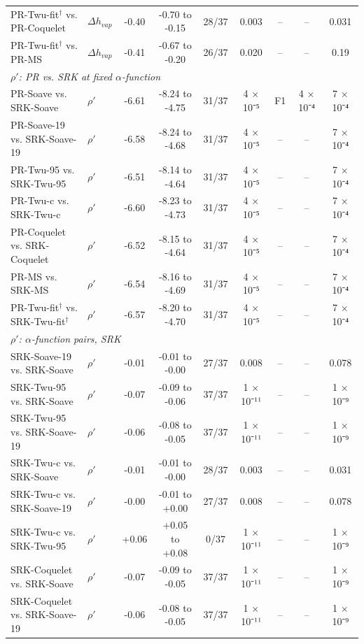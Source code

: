 \begin{table}[H]
\begin{tabular}{llccccccc}
PR-Twu-fit$^{\dagger}$ vs. PR-Coquelet & $\Delta h_{vap}$ & -0.40 & -0.70 to -0.15 & 28/37 & 0.003 & -- & -- & 0.031 \\
PR-Twu-fit$^{\dagger}$ vs. PR-MS & $\Delta h_{vap}$ & -0.41 & -0.67 to -0.20 & 26/37 & 0.020 & -- & -- & 0.19 \\
\multicolumn{9}{l}{\emph{$\rho'$: PR vs. SRK at fixed $\alpha$-function}} \\
PR-Soave vs. SRK-Soave & $\rho'$ & -6.61 & -8.24 to -4.75 & 31/37 & 4 × 10⁻⁵ & F1 & 4 × 10⁻⁴ & 7 × 10⁻⁴ \\
PR-Soave-19 vs. SRK-Soave-19 & $\rho'$ & -6.58 & -8.24 to -4.68 & 31/37 & 4 × 10⁻⁵ & -- & -- & 7 × 10⁻⁴ \\
PR-Twu-95 vs. SRK-Twu-95 & $\rho'$ & -6.51 & -8.14 to -4.64 & 31/37 & 4 × 10⁻⁵ & -- & -- & 7 × 10⁻⁴ \\
PR-Twu-c vs. SRK-Twu-c & $\rho'$ & -6.60 & -8.23 to -4.73 & 31/37 & 4 × 10⁻⁵ & -- & -- & 7 × 10⁻⁴ \\
PR-Coquelet vs. SRK-Coquelet & $\rho'$ & -6.52 & -8.15 to -4.64 & 31/37 & 4 × 10⁻⁵ & -- & -- & 7 × 10⁻⁴ \\
PR-MS vs. SRK-MS & $\rho'$ & -6.54 & -8.16 to -4.69 & 31/37 & 4 × 10⁻⁵ & -- & -- & 7 × 10⁻⁴ \\
PR-Twu-fit$^{\dagger}$ vs. SRK-Twu-fit$^{\dagger}$ & $\rho'$ & -6.57 & -8.20 to -4.70 & 31/37 & 4 × 10⁻⁵ & -- & -- & 7 × 10⁻⁴ \\
\multicolumn{9}{l}{\emph{$\rho'$: $\alpha$-function pairs, SRK}} \\
SRK-Soave-19 vs. SRK-Soave & $\rho'$ & -0.01 & -0.01 to -0.00 & 27/37 & 0.008 & -- & -- & 0.078 \\
SRK-Twu-95 vs. SRK-Soave & $\rho'$ & -0.07 & -0.09 to -0.06 & 37/37 & 1 × 10⁻¹¹ & -- & -- & 1 × 10⁻⁹ \\
SRK-Twu-95 vs. SRK-Soave-19 & $\rho'$ & -0.06 & -0.08 to -0.05 & 37/37 & 1 × 10⁻¹¹ & -- & -- & 1 × 10⁻⁹ \\
SRK-Twu-c vs. SRK-Soave & $\rho'$ & -0.01 & -0.01 to -0.00 & 28/37 & 0.003 & -- & -- & 0.031 \\
SRK-Twu-c vs. SRK-Soave-19 & $\rho'$ & -0.00 & -0.01 to +0.00 & 27/37 & 0.008 & -- & -- & 0.078 \\
SRK-Twu-c vs. SRK-Twu-95 & $\rho'$ & +0.06 & +0.05 to +0.08 & 0/37 & 1 × 10⁻¹¹ & -- & -- & 1 × 10⁻⁹ \\
SRK-Coquelet vs. SRK-Soave & $\rho'$ & -0.07 & -0.09 to -0.05 & 37/37 & 1 × 10⁻¹¹ & -- & -- & 1 × 10⁻⁹ \\
SRK-Coquelet vs. SRK-Soave-19 & $\rho'$ & -0.06 & -0.08 to -0.05 & 37/37 & 1 × 10⁻¹¹ & -- & -- & 1 × 10⁻⁹ \\

\end{tabular}
\end{table}
